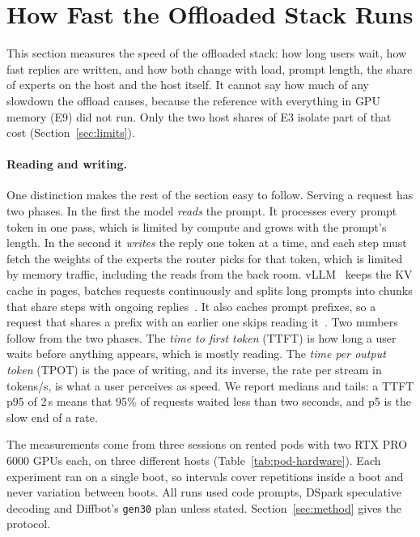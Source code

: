\section{How Fast the Offloaded Stack Runs}\label{sec:results}\label{sec:results-controlled}

This section measures the speed of the offloaded stack: how long users wait, how fast replies are written, and how
both change with load, prompt length, the share of experts on the host and the host itself. It cannot say how much
of any slowdown the offload causes, because the reference with everything in GPU memory (E9) did not run. Only the two
host shares of E3 isolate part of that cost (Section~\ref{sec:limits}).

\paragraph{Reading and writing.}
One distinction makes the rest of the section easy to follow. Serving a request has two phases. In the first the model
\emph{reads} the prompt. It processes every prompt token in one pass, which is limited by compute and grows with the
prompt's length. In the second it \emph{writes} the reply one token at a time, and each step must fetch the weights of
the experts the router picks for that token, which is limited by memory traffic, including the reads from the back
room. vLLM~\citep{kwon2023vllm} keeps the KV cache in pages, batches requests continuously and splits long prompts into
chunks that share steps with ongoing replies~\citep{agrawal2024sarathi}. It also caches prompt prefixes, so a request
that shares a prefix with an earlier one skips reading it~\citep{zheng2024sglang,vllm2026prefixcaching}. Two numbers
follow from the two phases. The \emph{time to first token} (TTFT) is how long a user waits before anything appears,
which is mostly reading. The \emph{time per output token} (TPOT) is the pace of writing, and its inverse, the rate per
stream in tokens/s, is what a user perceives as speed. We report medians and tails: a TTFT p95 of 2\,s means that 95\%
of requests waited less than two seconds, and p5 is the slow end of a rate.

The measurements come from three sessions on rented pods with two RTX PRO 6000 GPUs each, on three different hosts
(Table~\ref{tab:pod-hardware}). Each experiment ran on a single boot, so intervals cover repetitions inside a boot and
never variation between boots. All runs used code prompts, DSpark speculative decoding and Diffbot's \texttt{gen30}
plan unless stated. Section~\ref{sec:method} gives the protocol.

